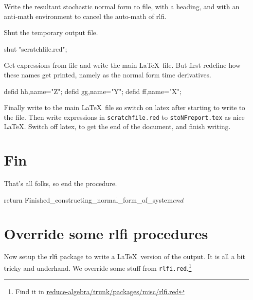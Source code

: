\documentclass[11pt,a5paper]{article}
\begin{document}
Write the resultant stochastic normal form to file, with a heading, and with an anti-math environment to cancel the auto-math of rlfi.

Shut the temporary output file.
\begin{reduce}
shut "scratchfile.red";
\end{reduce}

Get expressions from file and write the main \LaTeX\ file.
But first redefine how these names get printed, namely as the normal form time derivatives. 
\begin{reduce}
defid hh,name="\dot Z";
defid gg,name="\dot Y";
defid ff,name="\dot X";
\end{reduce}

Finally write to the main \LaTeX\ file so switch on latex after starting to write to the file.
Then write expressions in \verb|scratchfile.red| to \verb|stoNFreport.tex| as nice \LaTeX.
Switch off latex, to get the end of the document, and finish writing.


\section{Fin}
That's all folks, so end the procedure. 
\begin{reduce}
return Finished_constructing_normal_form_of_system$ 
end$
\end{reduce}





\section{Override some rlfi procedures}

Now setup the rlfi package to write a \LaTeX\ version of the output.  
It is all a bit tricky and underhand.  
We override some stuff from \verb|rlfi.red|.\footnote{Find it in \url{reduce-algebra/trunk/packages/misc/rlfi.red}}  
\end{document}
